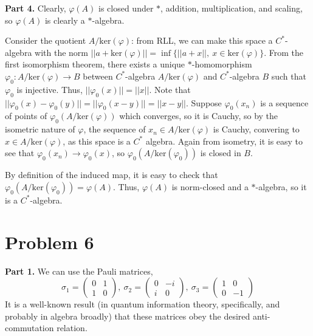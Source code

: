 \documentclass[aps,pra,showpacs,notitlepage,onecolumn,superscriptaddress,nofootinbib]{revtex4-1}
\newcommand{\hhrulefill}{\hspace{-1.0em}\hrulefill}
\theoremstyle{definition}
\begin{document}
\noindent \textbf{Part 4.} Clearly, $\varphi(A)$ is closed under $*$, addition, multiplication, and scaling, so $\varphi(A)$ is clearly a $*$-algebra.

Consider the quotient $A/\text{ker}(\varphi)$: from RLL, we can make this space a $C^{*}$-algebra with the norm $||a + \text{ker}(\varphi)|| = \inf \{||a + x||, \ x \in \text{ker}(\varphi)\}$. From the first isomorphism theorem,
there exists a unique $*$-homomorphism $\varphi_0 : A/\text{ker}(\varphi) \rightarrow B$ between $C^{*}$-algebra $A/\text{ker}(\varphi)$ and $C^{*}$-algebra $B$ such that $\varphi_0$ is injective. Thus, $||\varphi_0(x)|| = ||x||$.
Note that $||\varphi_0(x) - \varphi_0(y)|| = ||\varphi_0(x - y)|| = ||x - y||$. Suppose $\varphi_0(x_n)$ is a sequence of points of $\varphi_0(A/\text{ker}(\varphi))$ which converges, so it is Cauchy, so by the isometric nature of $\varphi$,
the sequence of $x_n \in A/\text{ker}(\varphi)$ is Cauchy, convering to $x \in A/\text{ker}(\varphi)$, as this space is a $C^{*}$ algebra. Again from isometry, it is easy to see that $\varphi_0(x_n) \rightarrow \varphi_0(x)$,
so $\varphi_0(A/\text{ker}(\varphi_0))$ is closed in $B$.

By definition of the induced map, it is easy to check that $\varphi_0(A/\text{ker}(\varphi_0)) = \varphi(A)$. Thus, $\varphi(A)$ is norm-closed and a $*$-algebra, so it is a $C^{*}$-algebra.

\hhrulefill

\section{Problem 6}

\noindent \textbf{Part 1.} We can use the Pauli matrices,
\begin{equation}
  \sigma_1 = \begin{pmatrix} 0 & 1 \\ 1 & 0 \end{pmatrix}, \ \sigma_2 = \begin{pmatrix} 0 & -i \\ i & 0 \end{pmatrix}, \ \sigma_3 = \begin{pmatrix} 1 & 0 \\ 0 & -1 \end{pmatrix}
\end{equation}
It is a well-known result (in quantum information theory, specifically, and probably in algebra broadly) that these matrices obey the desired anti-commutation relation.
\newline
\end{document}

